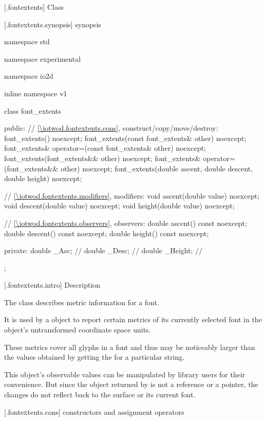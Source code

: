  [\iotwod.fontextents] {Class }

 [\iotwod.fontextents.synopsis] { synopsis}

\begin{codeblock}
namespace std { namespace experimental { namespace io2d { inline namespace v1 {
  class font_extents {
  public:
    // \ref{\iotwod.fontextents.cons}, construct/copy/move/destroy:
    font_extents() noexcept;
    font_extents(const font_extents& other) noexcept;
    font_extents& operator=(const font_extents& other) noexcept;
    font_extents(font_extents&& other) noexcept;
    font_extents& operator=(font_extents&& other) noexcept;
    font_extents(double ascent, double descent, double height) noexcept;

    // \ref{\iotwod.fontextents.modifiers}, modifiers:
    void ascent(double value) noexcept;
    void descent(double value) noexcept;
    void height(double value) noexcept;

    // \ref{\iotwod.fontextents.observers}, observers:
    double ascent() const noexcept;
    double descent() const noexcept;
    double height() const noexcept;

  private:
    double _Asc;    // \expos
    double _Desc;   // \expos
    double _Height; // \expos
  };
} } } }
\end{codeblock}

 [\iotwod.fontextents.intro] { Description}

\pnum
{}
The class  describes metric information for a font.

\pnum
It is used by a  object to report certain metrics of its currently selected font in the  object's untransformed coordinate space units.

\pnum
These metrics cover all glyphs in a font and thus may be noticeably larger than the values obtained by getting the  for a particular string.

\pnum
\enternote
This object's observable values can be manipulated by library users for their convenience. But since the  object returned by  is not a reference or a pointer, the changes do not reflect back to the surface or its current font.
\exitnote

 [\iotwod.fontextents.cons] { constructors and assignment operators}

